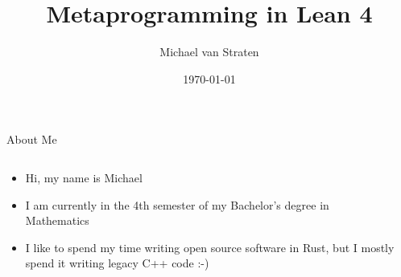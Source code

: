 \documentclass{beamer}
\title{Metaprogramming in Lean 4}
\author{Michael van Straten}
\date{\today}
\institute{Humboldt-Universität zu Berlin}
\begin{document}
\NoHyper

\begin{frame}{About Me}
    \begin{columns}
        \begin{column}{0.5\textwidth}
            \begin{itemize}[<+(0)->]
                \item Hi, my name is Michael
                \item I am currently in the 4th semester of my Bachelor's
                      degree in Mathematics
                \item I like to spend my time writing open source software in
                      Rust, but I mostly spend it writing legacy C++ code :-)
            \end{itemize}
        \end{column}
        \begin{column}{0.5\textwidth}
            \begin{center}
            \end{center}
        \end{column}
    \end{columns}

\end{frame}
\end{document}
